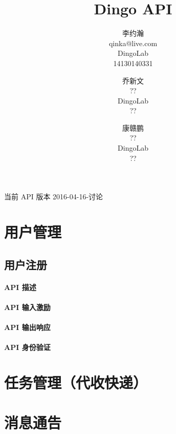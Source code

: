 \documentclass[UTF8]{article}
\author{ 李约瀚 \\ qinka@live.com \\ DingoLab \\ 14130140331 %
    \and 乔新文 \\ ?? \\ DingoLab \\ ??                      %
    \and 康赣鹏 \\ ?? \\ DingoLab \\ ??                      %
    }
\title{Dingo API}
\def\apiintr{\paragraph{\colorbox[rgb]{0.78,0.7,0.65}{API 描述}}} %
\def\apiexc{\paragraph{\colorbox[rgb]{0.78,0.7,0.65}{API 输入激励}}} %
\def\apiresp{\paragraph{\colorbox[rgb]{0.78,0.7,0.65}{API 输出响应}}} %
\def\apiauth{\paragraph{\colorbox[rgb]{0.78,0.7,0.65}{API 身份验证}}} %
\begin{document}
    \maketitle
    \newpage
    \tableofcontents
    \newpage
    
    当前 API 版本 2016-04-16-讨论
    \section{用户管理}
    \subsection{用户注册}
    \apiintr
    \apiexc
    \apiresp
    \apiauth
    
    \section{任务管理（代收快递）}

    \section{消息通告}
\end{document}
